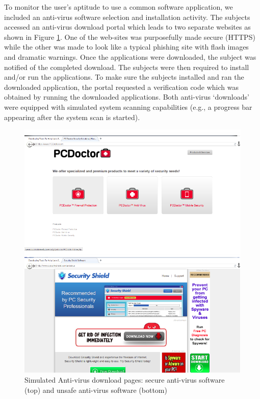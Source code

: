 To monitor the user's aptitude to use a common software application, we included an anti-virus software selection and installation activity. The subjects accessed an anti-virus download portal which leads to two separate websites as shown in Figure \ref{fig:virus}. One of the web-sites was purposefully made secure (HTTPS) while the other was made to look like a typical phishing site with flash images and dramatic warnings. Once the applications were downloaded, the subject was notified of the completed download. The subjects were then required to install and/or run the applications. To make sure the subjects installed and ran the downloaded application, the portal requested a verification code which was obtained by running the downloaded applications. Both anti-virus `downloads' were equipped with simulated system scanning capabilities (e.g., a progress bar appearing after the system scan is started).
\begin{figure}[pbt]
  \centering
\includegraphics[width=\columnwidth, keepaspectratio=true]{img/virus.png}
  \caption{Simulated Anti-virus download pages: secure anti-virus software (top) and unsafe anti-virus software (bottom)}
  \label{fig:virus}
\end{figure}




